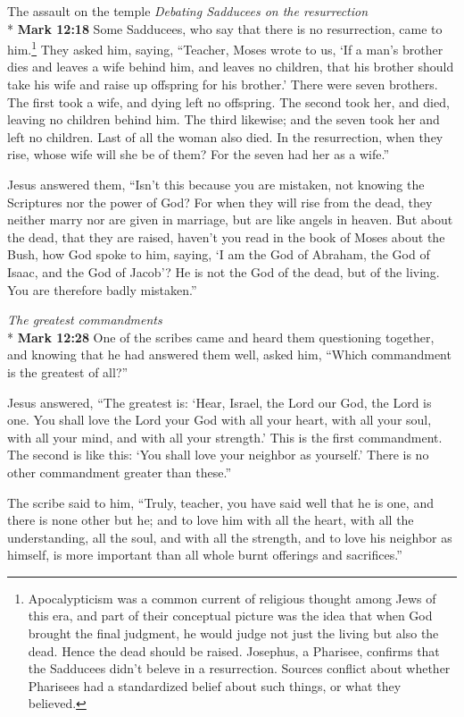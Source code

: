 \documentclass[10pt,twoside]{article} %
\newcommand{\quotesize}{\normalsize{}}
\newenvironment{quotetext}{\begingroup\quotesize}{\endgroup}
\newcommand{\intex}[1]{\index[texts]{#1}}
\newcommand{\bible}[2]{\begin{quotetext}\textbf{#1}\intex{#1} #2\end{quotetext}}
\newcommand{\gospelmark}[2]{\bible{Mark #1}{#2}}
\newcommand{\subhead}[1]{\emph{#1}\\*}
\begin{document}
\begin{section}{The assault on the temple}
\subhead{Debating Sadducees on the resurrection}
\gospelmark{12:18}{
Some Sadducees, who say that there is no resurrection, came to him.\footnote{Apocalypticism was a common
current of religious thought among Jews of this era, and part of their conceptual picture was the idea that
when God brought the final judgment, he would judge not just the living but also the dead. Hence the dead
should be raised. Josephus, a Pharisee, confirms that the Sadducees didn't beleve in a resurrection. Sources conflict about
whether Pharisees had a standardized belief about such things, or what they believed.} They asked him, saying,   ``Teacher, Moses wrote to us, `If a man's brother dies and leaves a wife behind him, and leaves no children, that his brother should take his wife and raise up offspring for his brother.'   There were seven brothers. The first took a wife, and dying left no offspring.   The second took her, and died, leaving no children behind him. The third likewise;   and the seven took her and left no children. Last of all the woman also died.   In the resurrection, when they rise, whose wife will she be of them? For the seven had her as a wife.''

  Jesus answered them, ``Isn't this because you are mistaken, not knowing the Scriptures nor the power of God?    For when they will rise from the dead, they neither marry nor are given in marriage, but are like angels in heaven.    But about the dead, that they are raised, haven't you read in the book of Moses about the Bush, how God spoke to him, saying, `I am the God of Abraham, the God of Isaac, and the God of Jacob'?    He is not the God of the dead, but of the living. You are therefore badly mistaken.'' 
}

\subhead{The greatest commandments}\label{greatest-commandments}
\gospelmark{12:28}{
One of the scribes came and heard them questioning together, and knowing that he had answered them well, asked him, ``Which commandment is the greatest of all?''

  Jesus answered, ``The greatest is: `Hear, Israel, the Lord our God, the Lord is one.    You shall love the Lord your God with all your heart, with all your soul, with all your mind, and with all your strength.' This is the first commandment.    The second is like this: `You shall love your neighbor as yourself.' There is no other commandment greater than these.''

  The scribe said to him, ``Truly, teacher, you have said well that he is one, and there is none other but he;   and to love him with all the heart, with all the understanding, all the soul, and with all the strength, and to love his neighbor as himself, is more important than all whole burnt offerings and sacrifices.''

}
\end{section}
\end{document}
